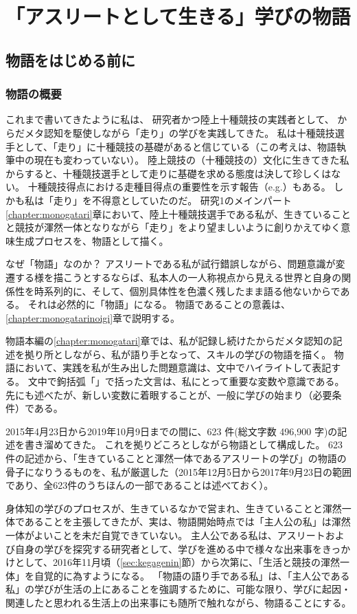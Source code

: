 \part{「アスリートとして生きる」学びの物語}
\chapter{物語をはじめる前に}

\section{物語の概要}
\label{sec:deca}
これまで書いてきたように私は、
研究者かつ陸上十種競技の実践者として、
からだメタ認知を駆使しながら「走り」の学びを実践してきた。
私は十種競技選手として、「走り」に十種競技の基礎があると信じている（この考えは、物語執筆中の現在も変わっていない）。
陸上競技の（十種競技の）文化に生きてきた私からすると、十種競技選手として走りに基礎を求める態度は決して珍しくはない。
十種競技得点における走種目得点の重要性を示す報告（e.g.\cite{yasuda:2013}）もある。
しかも私は「走り」を不得意としていたのだ。
研究1のメインパート\ref{chapter:monogatari}章において、陸上十種競技選手である私が、生きていることと競技が渾然一体となりながら「走り」をより望ましいように創りかえてゆく意味生成プロセスを、物語として描く。


なぜ「物語」なのか？
アスリートである私が試行錯誤しながら、問題意識が変遷する様を描こうとするならば、私本人の一人称視点から見える世界と自身の関係性を時系列的に、そして、個別具体性を色濃く残したまま語る他ないからである。
それは必然的に「物語」になる。
物語であることの意義は、\ref{chapter:monogatarinoigi}章で説明する。

物語本編の\ref{chapter:monogatari}章では、私が記録し続けたからだメタ認知の記述を拠り所としながら、私が語り手となって、スキルの学びの物語を描く。
物語において、実践を私が生み出した問題意識は、文中でハイライトして表記する。
文中で鉤括弧「」で括った文言は、私にとって重要な変数や意識である。
先にも述べたが、新しい変数に着眼することが、一般に学びの始まり（必要条件）である。

2015年4月23日から2019年10月9日までの間に、623 件(総文字数 496,900 字)の記述を書き溜めてきた。
これを拠りどころとしながら物語として構成した。
623件の記述から、「生きていることと渾然一体であるアスリートの学び」の物語の骨子になりうるものを、私が厳選した（2015年12月5日から2017年9月23日の範囲であり、全623件のうちほんの一部であることは述べておく）。

身体知の学びのプロセスが、生きているなかで営まれ、生きていることと渾然一体であることを主張してきたが、実は、物語開始時点では「主人公の私」は渾然一体がよいことを未だ自覚できていない。
主人公である私は、アスリートおよび自身の学びを探究する研究者として、学びを進める中で様々な出来事をきっかけとして、2016年11月頃（\ref{sec:kegagenin}節）から次第に、「生活と競技の渾然一体」を自覚的に為すようになる。
「物語の語り手である私」は、「主人公である私」の学びが生活の上にあることを強調するために、可能な限り、学びに起因・関連したと思われる生活上の出来事にも随所で触れながら、物語ることにする。




